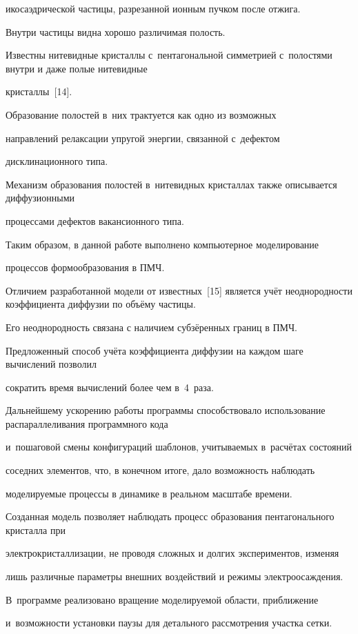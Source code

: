 икосаэдрической частицы,  разрезанной ионным пучком после отжига.

Внутри частицы видна хорошо различимая полость.

Известны нитевидные кристаллы с~пентагональной симметрией с~полостями внутри и даже полые нитевидные

кристаллы~[14].

Образование полостей в~них трактуется как одно из возможных

направлений релаксации упругой энергии,  связанной с~дефектом

дисклинационного типа.

Механизм образования полостей в~нитевидных кристаллах также описывается диффузионными

процессами дефектов вакансионного типа.



Таким образом,  в данной работе выполнено компьютерное моделирование

процессов формообразования в ПМЧ.

Отличием разработанной модели от известных~[15] является учёт неоднородности коэффициента диффузии по \mbox{объёму} частицы.

Его неоднородность связана с наличием субзёренных границ в ПМЧ.

Предложенный способ учёта коэффициента диффузии на каждом шаге вычислений позволил

сократить время вычислений более чем в~4~раза.

Дальнейшему ускорению работы программы способствовало использование распараллеливания программного кода

и~пошаговой смены конфигураций шаблонов,  учитываемых в~расчётах состояний

соседних элементов,  что, в конечном итоге, дало возможность наблюдать

моделируемые процессы в динамике в реальном масштабе времени.

Созданная модель позволяет наблюдать процесс образования пентагонального кристалла при

электрокристаллизации,  не проводя сложных и долгих экспериментов,  изменяя

лишь различные параметры внешних воздействий и режимы электроосаждения.

В~программе реализовано вращение моделируемой области,  приближение

и~возможности установки паузы для детального рассмотрения участка сетки.

